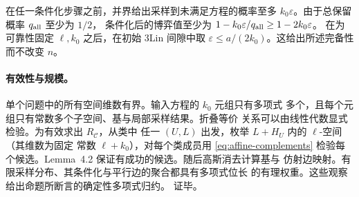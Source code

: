 在任一条件化步骤之前，并界给出采样到未满足方程的概率至多
$k_0\varepsilon$。由于总保留概率 $q_{\rm all}$ 至少为 $1/2$，
条件化后的博弈值至少为
$1-k_0\varepsilon/q_{\rm all}\ge1-2k_0\varepsilon$。
在为可靠性固定 $\ell,k_0$ 之后，在初始 3Lin 间隙中取
$\varepsilon\leq a/(2k_0)$。这给出所述完备性而不改变 $n$。

\paragraph{有效性与规模。}
单个问题中的所有空间维数有界。输入方程的 $k_0$ 元组只有多项式
多个，且每个元组只有常数多个子空间、基与局部采样结果。折叠等价
关系可以由线性代数显式检验。为有效求出 $R_{\mathcal C}$，从类中
任一 $(U,L)$ 出发，枚举 $L+H_U$ 内的 $\ell$-空间（其维数为固定
常数 $\ell+k_0$），对每个类成员用 \eqref{eq:affine-complements}
检验每个候选。Lemma~4.2 保证有成功的候选。随后高斯消去计算基与
仿射边映射。有限采样分布、其条件化与平行边的聚合都具有多项式位长
的有理权重。这些观察给出命题所断言的确定性多项式归约。
 证毕。
